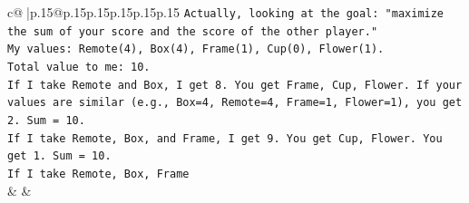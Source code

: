 \documentclass{article}
\begin{document}
{\begin{supertabular}{c@{$\;$}|p{.15\linewidth}@{}p{.15\linewidth}p{.15\linewidth}p{.15\linewidth}p{.15\linewidth}p{.15\linewidth}}
{{{\texttt{Actually, looking at the goal: "maximize the sum of your score and the score of the other player."} \\
\texttt{My values: Remote(4), Box(4), Frame(1), Cup(0), Flower(1).} \\
\texttt{Total value to me: 10.} \\
\texttt{If I take Remote and Box, I get 8. You get Frame, Cup, Flower. If your values are similar (e.g., Box=4, Remote=4, Frame=1, Flower=1), you get 2. Sum = 10.} \\
\texttt{If I take Remote, Box, and Frame, I get 9. You get Cup, Flower. You get 1. Sum = 10.} \\
\texttt{If I take Remote, Box, Frame} \\
            }
        }
    }
    & & \\ \\


\end{supertabular}}
\end{document}
